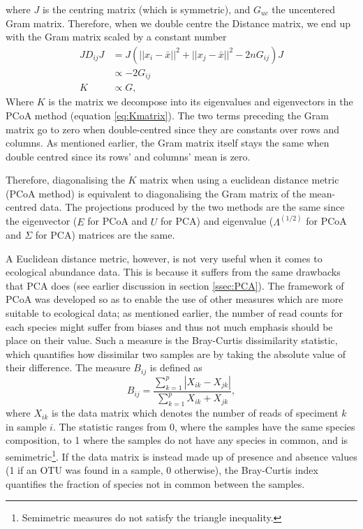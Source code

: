 where $J$ is the centring matrix (which  is symmetric), and $G_{uc}$ the uncentered Gram matrix. Therefore, when we double centre the Distance matrix, we end up with the Gram matrix scaled by a constant number
\begin{align}
JD_{ij}J&= J\left(||x_i - \bar{x}||^2 + ||x_j - \bar{x}||^2 - 2nG_{ij}\right)J \\
&\propto -2G_{ij}\\
K &\propto G,
\end{align}
Where $K$ is the matrix we decompose into its eigenvalues and eigenvectors in the PCoA method (equation \eqref{eq:Kmatrix}). The two terms preceding the Gram matrix go to zero when double-centred since they are constants over rows and columns. As mentioned earlier, the Gram matrix itself stays the same when double centred since its rows' and columns' mean is zero. 

Therefore, diagonalising the $K$ matrix when using a euclidean distance metric (PCoA method) is equivalent to diagonalising the Gram matrix of the mean-centred data. The projections produced by the two methods are the same since the eigenvector ($E$ for PCoA and $U$ for PCA) and eigenvalue ($\Lambda^{(1/2)}$ for PCoA and $\Sigma $ for PCA) matrices are the same. 

A Euclidean distance metric, however, is not very useful when it comes to ecological abundance data. This is because it suffers from the same drawbacks that PCA does (see earlier discussion in section \ref{ssec:PCA}). The framework of PCoA was developed so as to enable the use of other measures which are more suitable to ecological data; as mentioned earlier, the number of read counts for each species might suffer from biases and thus not much emphasis should be place on their value. Such a measure is the Bray-Curtis dissimilarity statistic, which quantifies how dissimilar two samples are by taking the absolute value of their difference. The measure $B_{ij}$ is defined as
\begin{equation}
    B_{ij} = \frac{\sum_{k =1}^{p} |X_{ik} - X_{jk}|}{\sum_{k =1}^{p} X_{ik} + X_{jk}},
\end{equation}
where $X_{ik}$ is the data matrix which denotes the number of reads of speciment $k$ in sample $i$. The statistic ranges from 0, where the samples have the same species composition, to 1 where the samples do not have any species in common, and is semimetric\footnote{Semimetric measures do not satisfy the triangle inequality.}. If the data matrix is instead made up of presence and absence values (1 if an OTU was found in a sample, 0 otherwise), the Bray-Curtis index quantifies the fraction of species not in common between the samples. 

